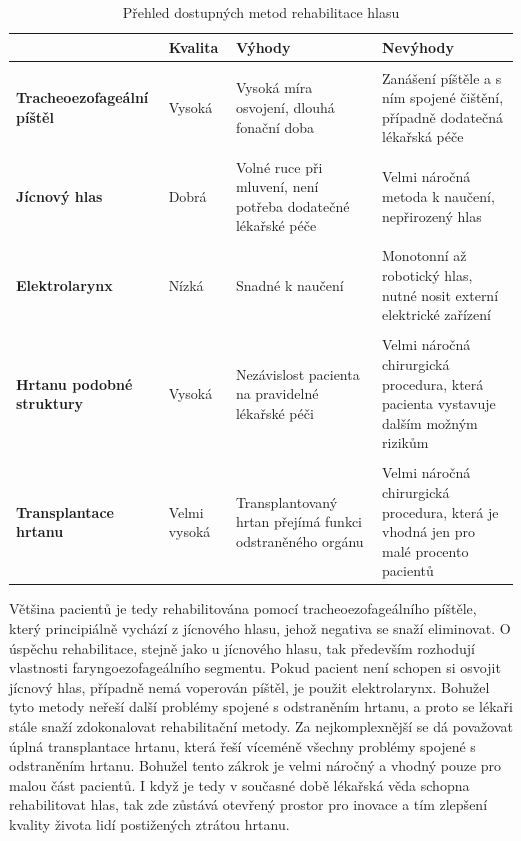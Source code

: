 \begin{table}[ht]
  \centering
  \begin{tabularx}{1.0\textwidth}{L{1.09} L{0.71} L{1.1} L{1.1}}
    & \textbf{Kvalita} & \textbf{Výhody} & \textbf{Nevýhody} \\
    \toprule \\ [-1.75ex]

    \textbf{Tracheoezofageální píštěl} & Vysoká & Vysoká míra osvojení, dlouhá fonační doba & Zanášení píštěle a s ním spojené čištění, případně dodatečná lékařská péče \\
    \midrule \\ [-1.75ex]

    \textbf{Jícnový hlas} & Dobrá & Volné ruce při mluvení, není potřeba dodatečné lékařské péče & Velmi náročná metoda k naučení, nepřirozený hlas \\
    \midrule \\ [-1.75ex]

    \textbf{Elektrolarynx} & Nízká & Snadné k naučení & Monotonní až robotický hlas, nutné nosit externí elektrické zařízení \\
    \midrule \\ [-1.75ex]

    \textbf{Hrtanu podobné struktury} & Vysoká & Nezávislost pacienta na pravidelné lékařské péči & Velmi náročná chirurgická procedura, která pacienta vystavuje dalším možným rizikům  \\
    \midrule \\ [-1.75ex]

    \textbf{Transplantace hrtanu} & Velmi vysoká & Transplantovaný hrtan přejímá funkci odstraněného orgánu & Velmi náročná chirurgická procedura, která je vhodná jen pro malé procento pacientů \\
  \end{tabularx}

  \caption{Přehled dostupných metod rehabilitace hlasu \label{tab:treatment:summary}}
\end{table}

Většina pacientů je tedy rehabilitována pomocí tracheoezofageálního píštěle,
který principiálně vychází z jícnového hlasu, jehož negativa se snaží
eliminovat. O úspěchu rehabilitace, stejně jako u jícnového hlasu, tak
především rozhodují vlastnosti faryngoezofageálního segmentu. Pokud pacient
není schopen si osvojit jícnový hlas, případně nemá voperován píštěl, je
použit elektrolarynx. Bohužel tyto metody neřeší další problémy spojené s
odstraněním hrtanu, a proto se lékaři stále snaží zdokonalovat rehabilitační
metody. Za nejkomplexnější se dá považovat úplná transplantace hrtanu, která
řeší víceméně všechny problémy spojené s odstraněním hrtanu. Bohužel tento
zákrok je velmi náročný a vhodný pouze pro malou část pacientů.
I když je tedy v současné době lékařská věda schopna rehabilitovat hlas, tak
zde zůstává otevřený prostor pro inovace a tím zlepšení kvality života lidí
postižených ztrátou hrtanu.


